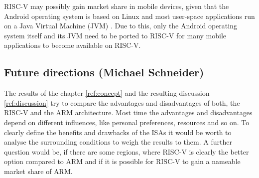 \documentclass[conference]{IEEEtran}
\begin{document}
	RISC-V may possibly gain market share in mobile devices, given that the Android operating
	system is based on Linux and most user-space applications
	run on a Java Virtual Machine (JVM) \cite{Ehringer2010}. Due to this, only
	the Android operating system itself and its JVM need to be
	ported to RISC-V for many mobile applications to
	become available on RISC-V.

	\subsection{Future directions (Michael Schneider)}
	\label{ref:future}

	The results of the chapter \ref{ref:concept} and the resulting discussion \ref{ref:discussion} try to compare the advantages and disadvantages of both, the RISC-V and the ARM architecture. Most time the advantages and disadvantages depend on different influences, like personal preferences, resources and so on. To clearly define the benefits and drawbacks of the \glspl{ISA} it would be worth to analyse the surrounding conditions to weigh the results to them. A further question would be, if there are some regions, where RISC-V is clearly the better option compared to ARM and if it is possible for RISC-V to gain a nameable market share of ARM. 


\end{document}
